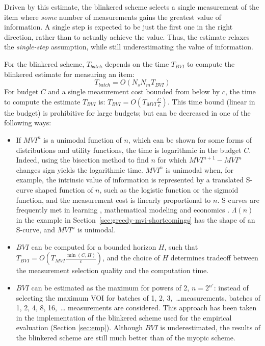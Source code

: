 Driven by this estimate, the blinkered scheme selects a single
measurement of the item where {\em some} number of measurements gains
the greatest value of information.  A single step is expected to be
just the first one in the right direction, rather than to actually
achieve the value. Thus, the estimate relaxes the {\it single-step}
assumption, while still underestimating the value of information.

For the blinkered scheme, $T_{batch}$ depends on the time
$T_{BVI}$ to compute the blinkered estimate for measuring an item:
\begin{equation}
\label{eq:thr-time-batch-blinkered}
T_{batch}=O(N_sN_mT_{BVI})
\end{equation}
For budget $C$ and a single measurement cost bounded from below
 by $c$, the time to compute the estimate $T_{BVI}$ is:
$T_{BVI}=O\left(T_{MVI}\frac C c\right)$.  This time bound (linear in the budget)
is prohibitive for large budgets; but can be decreased in one of
the following ways:

\begin{itemize}
\item If $MVI^n$ is a unimodal function of $n$, which can be shown for some
  forms of distributions and utility functions,
  the time is logarithmic in the budget $C$. Indeed, using the
  bisection method to find $n$ for which $MVI^{n+1}-MVI^n$ changes sign
  yields the logarithmic time. $MVI^n$ is unimodal when, for example,
  the intrinsic value of information is represented by a translated S-curve
  shaped function of $n$, such as the logistic function or the sigmoid
  function, and the measurement cost is linearly proportional to
  $n$. S-curves are frequently met in learning \cite{Russell.aima},
  mathematical modeling \cite{Gershenfeld.modeling} and economics
  \cite{Johansson.s-curve}. $\Lambda(n)$ in the example in
  Section~\ref{sec:greedy-mvi-shortcomings} has the shape of an S-curve, and $MVI^n$
   is unimodal. 
\item $BVI$ can be computed for a bounded horizon $H$, such that
  $T_{BVI}=O\left(T_{MVI} \frac {\min (C, H)} c\right)$, and the
  choice of $H$ determines tradeoff between the measurement selection
  quality and the computation time.
\item $BVI$ can be estimated as the maximum for powers of
  2, $n=2^{n'}$: instead of selecting the maximum VOI for batches of
  1, 2, 3,~\ldots measurements, batches of 1, 2, 4, 8, 16,~\ldots
  measurements are considered.  This approach has been taken  in the implementation of
  the blinkered scheme used for the empirical evaluation (Section
  \ref{sec:emp}). Although $BVI$ is underestimated, the results of
  the blinkered scheme are still much better than of the myopic
  scheme.
\end{itemize}

